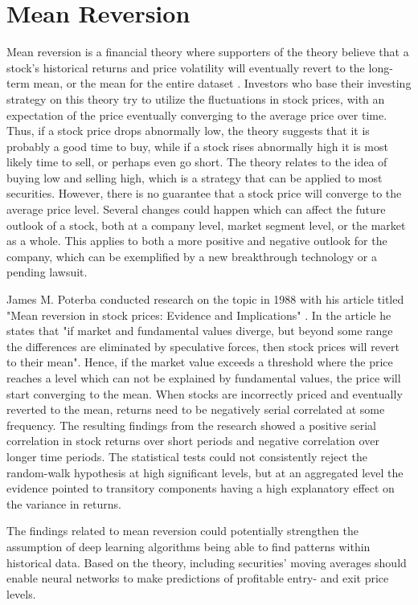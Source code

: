 \section{Mean Reversion}
Mean reversion is a financial theory where supporters of the theory believe that a stock's historical returns and price volatility will eventually revert to the long-term mean, or the mean for the entire dataset \cite{chenj}. Investors who base their investing strategy on this theory try to utilize the fluctuations in stock prices, with an expectation of the price eventually converging to the average price over time. Thus, if a stock price drops abnormally low, the theory suggests that it is probably a good time to buy, while if a stock rises abnormally high it is most likely time to sell, or perhaps even go short. The theory relates to the idea of buying low and selling high, which is a strategy that can be applied to most securities. However, there is no guarantee that a stock price will converge to the average price level. Several changes could happen which can affect the future outlook of a stock, both at a company level, market segment level, or the market as a whole. This applies to both a more positive and negative outlook for the company, which can be exemplified by a new breakthrough technology or a pending lawsuit. 

\indent \newline 
James M. Poterba conducted research on the topic in 1988 with his article titled "Mean reversion in stock prices: Evidence and Implications" \cite{poterba}. In the article he states that "if market and fundamental values diverge, but beyond some range the differences are eliminated by speculative forces, then stock prices will revert to their mean". Hence, if the market value exceeds a threshold where the price reaches a level which can not be explained by fundamental values, the price will start converging to the mean. When stocks are incorrectly priced and eventually reverted to the mean, returns need to be negatively serial correlated at some frequency. The resulting findings from the research showed a positive serial correlation in stock returns over short periods and negative correlation over longer time periods. The statistical tests could not consistently reject the random-walk hypothesis at high significant levels, but at an aggregated level the evidence pointed to transitory components having a high explanatory effect on the variance in returns.    

\indent \newline 
The findings related to mean reversion could potentially strengthen the assumption of deep learning algorithms being able to find patterns within historical data. Based on the theory, including securities' moving averages should enable neural networks to make predictions of profitable entry- and exit price levels.  

